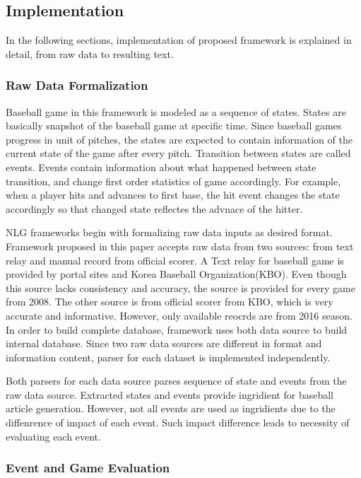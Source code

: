 \documentclass[11pt,letterpaper]{article}
\begin{document}
\subsection{Implementation}

In the following sections, implementation of proposed framework is explained in detail, from raw data to resulting text. 

\subsubsection{Raw Data Formalization}

Baseball game in this framework is modeled as a sequence of states. States are basically snapshot of the baseball game at specific time. Since baseball games progress in unit of pitches, the states are expected to contain information of the current state of the game after every pitch. Transition between states are called events. Events contain information about what happened between state transition, and change first order statistics of game accordingly. For example, when a player hits and advances to first base, the hit event changes the state accordingly so that changed state reflectes the advnace of the hitter. 

NLG frameworks begin with formalizing raw data inputs as desired format. Framework proposed in this paper accepts raw data from two sources: from text relay and manual record from official scorer. A Text relay for baseball game is provided by portal sites and Korea Baseball Organization(KBO). Even though this source lacks consistency and accuracy, the source is provided for every game from 2008. The other source is from official scorer from KBO, which is very accurate and informative. However, only available reocrds are from 2016 season. In order to build complete database, framework uses both data source to build internal database. Since two raw data sources are different in format and information content, parser for each dataset is implemented independently. 

Both parsers for each data source parses sequence of state and events from the raw data source. Extracted states and events provide ingridient for baseball article generation. However, not all events are used as ingridients due to the diffenrence of impact of each event. Such impact difference leads to necessity of evaluating each event. 

\subsubsection{Event and Game Evaluation} 
\end{document}

